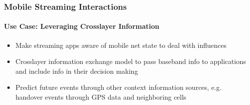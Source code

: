 \documentclass{beamer}
\begin{document}
\begin{frame}
	\frametitle{Mobile Streaming Interactions}
	\framesubtitle{Use Case: Leveraging Crosslayer Information}

	\begin{overlayarea}{\textwidth}{\textheight}
		\begin{itemize}
			\item Make streaming apps aware of mobile net state to deal with influences
			\item Crosslayer information exchange model to pass baseband info to applications and include info in their decision making
			\item Predict future events through other context information sources, e.g. handover events through GPS data and neighboring cells
		\end{itemize}
		\vspace{-0.25cm}
	\end{overlayarea}
\end{frame}
\end{document}
